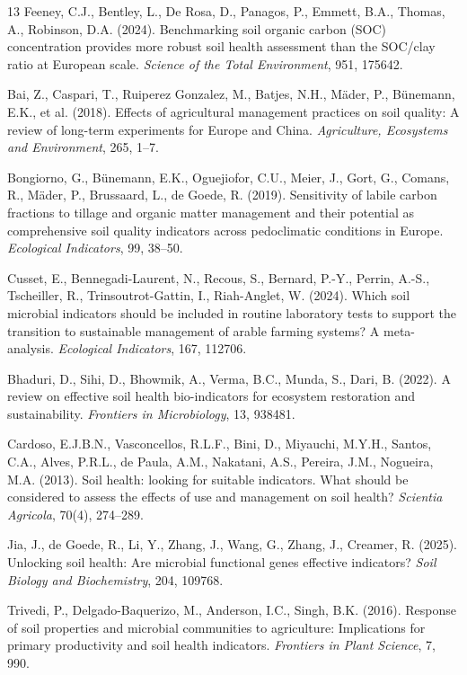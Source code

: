 \documentclass[english]{ai4science_ysda}
\begin{document}
\begin{thebibliography}{13}
Feeney, C.J., Bentley, L., De Rosa, D., Panagos, P., Emmett, B.A., Thomas, A.,
Robinson, D.A. (2024). Benchmarking soil organic carbon (SOC) concentration
provides more robust soil health assessment than the SOC/clay ratio at European
scale. \emph{Science of the Total Environment}, 951, 175642.

Bai, Z., Caspari, T., Ruiperez Gonzalez, M., Batjes, N.H., Mäder, P.,
Bünemann, E.K., et al. (2018). Effects of agricultural management practices on
soil quality: A review of long-term experiments for Europe and China.
\emph{Agriculture, Ecosystems and Environment}, 265, 1--7.

Bongiorno, G., Bünemann, E.K., Oguejiofor, C.U., Meier, J., Gort, G., Comans, R.,
Mäder, P., Brussaard, L., de Goede, R. (2019). Sensitivity of labile carbon
fractions to tillage and organic matter management and their potential as
comprehensive soil quality indicators across pedoclimatic conditions in Europe.
\emph{Ecological Indicators}, 99, 38--50.

Cusset, E., Bennegadi-Laurent, N., Recous, S., Bernard, P.-Y., Perrin, A.-S.,
Tscheiller, R., Trinsoutrot-Gattin, I., Riah-Anglet, W. (2024). Which soil
microbial indicators should be included in routine laboratory tests to support
the transition to sustainable management of arable farming systems?
A meta-analysis. \emph{Ecological Indicators}, 167, 112706.

Bhaduri, D., Sihi, D., Bhowmik, A., Verma, B.C., Munda, S., Dari, B. (2022).
A review on effective soil health bio-indicators for ecosystem restoration and
sustainability. \emph{Frontiers in Microbiology}, 13, 938481.

Cardoso, E.J.B.N., Vasconcellos, R.L.F., Bini, D., Miyauchi, M.Y.H.,
Santos, C.A., Alves, P.R.L., de Paula, A.M., Nakatani, A.S., Pereira, J.M.,
Nogueira, M.A. (2013). Soil health: looking for suitable indicators. What
should be considered to assess the effects of use and management on soil
health? \emph{Scientia Agricola}, 70(4), 274--289.

Jia, J., de Goede, R., Li, Y., Zhang, J., Wang, G., Zhang, J., Creamer, R.
(2025). Unlocking soil health: Are microbial functional genes effective
indicators? \emph{Soil Biology and Biochemistry}, 204, 109768.

Trivedi, P., Delgado-Baquerizo, M., Anderson, I.C., Singh, B.K. (2016).
Response of soil properties and microbial communities to agriculture:
Implications for primary productivity and soil health indicators.
\emph{Frontiers in Plant Science}, 7, 990.


\end{thebibliography}
\end{document}
